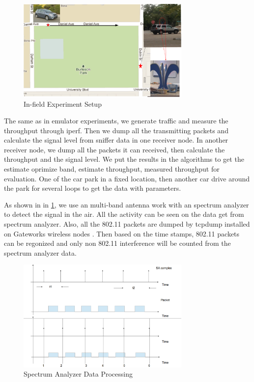 \begin{figure}
\centering
\includegraphics[width=85mm]{figure/infield}
\caption{In-field Experiment Setup}
\label{fig:infield}
\end{figure}


The same as in emulator experiments, we generate traffic and measure the throughput through iperf. Then we dump all the transmitting packets and calculate the signal level from sniffer data in one receiver node. 
In another receiver node, we dump all the packets it can received, then calculate the throughput and the signal level. We put the results in the algorithms to get the estimate oprimize band, estimate throughput, measured throughput for evaluation.
One of the car park in a fixed location, then another car drive around the park for several loops to get the data with parameters. 

As shown in in \ref{fig:infield}, we use an multi-band antenna work with an spectrum analyzer to detect the signal in the air. All the activity can be seen on the data get from spectrum analyzer.
Also, all the 802.11 packets are dumped by tcpdump installed on Gateworks wireless nodes \cite{jacobson1989tcpdump}. Then based on the time stamps, 802.11 packets can be regonized and only non 802.11 interference will be counted from the spectrum analyzer data.  

\begin{figure}
\centering
\includegraphics[width=85mm]{figure/sa_process}
\caption{Spectrum Analyzer Data Processing}
\label{fig:sa_process}
\end{figure}


